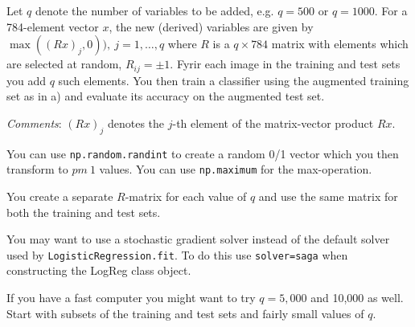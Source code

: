 \documentclass[11pt]{article}
\begin{document}
Let \(q\) denote the number of variables to be added, e.g. \(q=500\) or
\(q=1000\). For a 784-element vector \(x\), the new (derived) variables
are given by \(\max{((Rx)_j,0)}),~j=1,\ldots,q\) where \(R\) is a
\(q \times 784\) matrix with elements which are selected at random,
\(R_{ij}=\pm 1\). Fyrir each image in the training and test sets you add
\(q\) such elements. You then train a classifier using the augmented
training set as in a) and evaluate its accuracy on the augmented test
set.

\emph{Comments}: \((Rx)_j\) denotes the \(j\)-th element of the
matrix-vector product \(Rx\).

You can use \texttt{np.random.randint} to create a random 0/1 vector
which you then transform to \(pm~1\) values. You can use
\texttt{np.maximum} for the max-operation.

You create a separate \(R\)-matrix for each value of \(q\) and use the
same matrix for both the training and test sets.

You may want to use a stochastic gradient solver instead of the default
solver used by \texttt{LogisticRegression.fit}. To do this use
\texttt{solver=saga} when constructing the LogReg class object.

If you have a fast computer you might want to try \(q=5,000\) and 10,000
as well. Start with subsets of the training and test sets and fairly
small values of \(q\).
\end{document}
